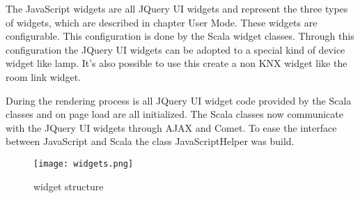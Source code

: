 The JavaScript widgets are all JQuery UI widgets and represent the three types of widgets, which are described in chapter User Mode. These widgets are configurable. This configuration is done by the Scala widget classes. Through this configuration the JQuery UI widgets can be adopted to a special kind of device widget like lamp. It's also possible to use this create a non KNX widget like the room link widget.  

During the rendering process is all JQuery UI widget code provided by the Scala classes and on page load are all initialized. The Scala classes now communicate with the JQuery UI widgets through AJAX and Comet. To ease the interface between JavaScript and Scala the class JavaScriptHelper was build. 
  \begin{figure}[h]
  \centering
  \texttt{[image: widgets.png]}
  \caption{widget structure}
  \label{fig:widgets}
  \end{figure}
